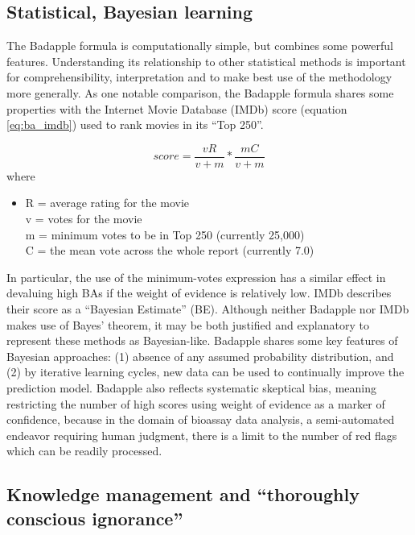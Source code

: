 \subsection{Statistical, Bayesian learning}

The Badapple formula is computationally simple, but combines some powerful features. Understanding its relationship to other statistical methods is important for comprehensibility, interpretation and to make best use of the methodology more generally. As one notable comparison, the Badapple formula shares some properties with the Internet Movie Database (IMDb) score (equation \ref{eq:ba_imdb}) used to rank movies in its “Top 250”\cite{IMDb_undated-ci}.

\begin{equation}
score = \frac{vR}{v + m} * \frac{mC}{v + m}
\label{eq:ba_imdb}
\end{equation}
where
\begin{itemize}
\item[] R = average rating for the movie \\
v = votes for the movie \\
m = minimum votes to be in Top 250 (currently 25,000) \\
C = the mean vote across the whole report (currently 7.0) \\
\end{itemize}

In particular, the use of the minimum-votes expression has a similar effect in devaluing high BAs if the weight of evidence is relatively low. IMDb describes their score as a “Bayesian Estimate” (BE). Although neither Badapple nor IMDb makes use of Bayes’ theorem, it may be both justified and explanatory to represent these methods as Bayesian-like. Badapple shares some key features of Bayesian approaches: (1) absence of any assumed probability distribution, and (2) by iterative learning cycles, new data can be used to continually improve the prediction model. Badapple also reflects systematic skeptical bias, meaning restricting the number of high scores using weight of evidence as a marker of confidence, because in the domain of bioassay data analysis, a semi-automated endeavor requiring human judgment, there is a limit to the number of red flags which can be readily processed.

\subsection{Knowledge management and “thoroughly conscious ignorance”}

